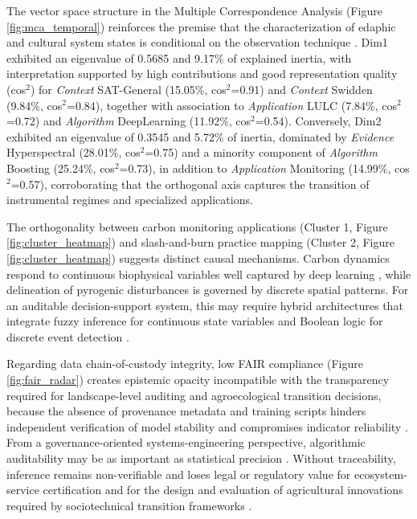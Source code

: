 \documentclass[lineno,pdflatex,sn-apa]{sn-jnl}
\begin{document}
The vector space structure in the Multiple Correspondence Analysis (Figure \ref{fig:mca_temporal}) reinforces the premise that the characterization of edaphic and cultural system states is conditional on the observation technique \citep{Reichstein2019}. Dim1 exhibited an eigenvalue of 0.5685 and 9.17\% of explained inertia, with interpretation supported by high contributions and good representation quality (cos$^2$) for \textit{Context} SAT-General (15.05\%, cos$^2$=0.91) and \textit{Context} Swidden (9.84\%, cos$^2$=0.84), together with association to \textit{Application} LULC (7.84\%, cos$^2$=0.72) and \textit{Algorithm} DeepLearning (11.92\%, cos$^2$=0.54). Conversely, Dim2 exhibited an eigenvalue of 0.3545 and 5.72\% of inertia, dominated by \textit{Evidence} Hyperspectral (28.01\%, cos$^2$=0.75) and a minority component of \textit{Algorithm} Boosting (25.24\%, cos$^2$=0.73), in addition to \textit{Application} Monitoring (14.99\%, cos$^2$=0.57), corroborating that the orthogonal axis captures the transition of instrumental regimes and specialized applications.

The orthogonality between carbon monitoring applications (Cluster 1, Figure \ref{fig:cluster_heatmap}) and slash-and-burn practice mapping (Cluster 2, Figure \ref{fig:cluster_heatmap}) suggests distinct causal mechanisms. Carbon dynamics respond to continuous biophysical variables well captured by deep learning \citep{Celette2016WaterStress}, while delineation of pyrogenic disturbances is governed by discrete spatial patterns. For an auditable decision-support system, this may require hybrid architectures that integrate fuzzy inference for continuous state variables and Boolean logic for discrete event detection \citep{Akram2026}.

Regarding data chain-of-custody integrity, low FAIR compliance (Figure \ref{fig:fair_radar}) creates epistemic opacity incompatible with the transparency required for landscape-level auditing and agroecological transition decisions, because the absence of provenance metadata and training scripts hinders independent verification of model stability and compromises indicator reliability \citep{Tuia2021,Samuel2021,Ivie2018,Zheng2024}. From a governance-oriented systems-engineering perspective, algorithmic auditability may be as important as statistical precision \citep{Rudin2019}. Without traceability, inference remains non-verifiable and loses legal or regulatory value for ecosystem-service certification and for the design and evaluation of agricultural innovations required by sociotechnical transition frameworks \citep{Tuia2021}.
\end{document}
